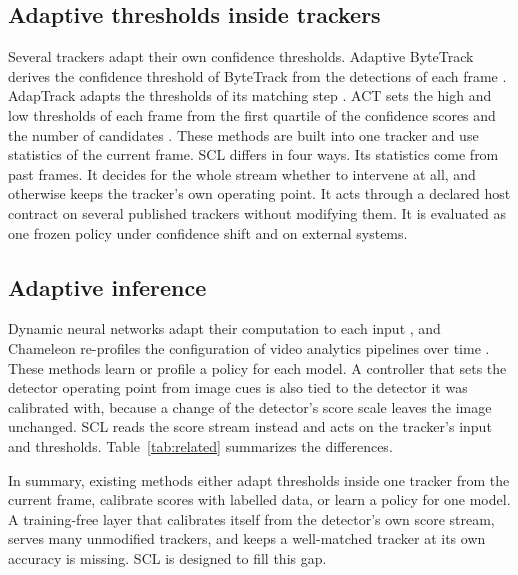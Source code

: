 \documentclass[pdflatex,sn-mathphys-num,iicol]{sn-jnl}
\newcommand{\scl}{SCL}
\begin{document}
\subsection{Adaptive thresholds inside trackers}
Several trackers adapt their own confidence thresholds. Adaptive ByteTrack
derives the confidence threshold of ByteTrack from the detections of each
frame \cite{ma2023adaptivebytetrack}. AdapTrack adapts the thresholds of its
matching step \cite{shim2024adaptrack}. ACT sets the high and low thresholds
of each frame from the first quartile of the confidence scores and the number
of candidates \cite{act2026adaptive}. These methods are built into one tracker
and use statistics of the current frame. \scl{} differs in
four ways. Its statistics come from past frames. It decides for the whole
stream whether to intervene at all, and otherwise keeps the tracker's own
operating point. It acts through a declared host contract on several
published trackers without modifying them. It is evaluated as one frozen
policy under confidence shift and on external systems.

\subsection{Adaptive inference}
Dynamic neural networks adapt their computation to each input
\cite{han2022dynamic}, and Chameleon re-profiles the configuration of video
analytics pipelines over time \cite{jiang2018chameleon}. These methods learn or
profile a policy for each model. A controller that sets the detector operating
point from image cues is also tied to the detector it was calibrated with,
because a change of the detector's score scale leaves the image unchanged.
\scl{} reads the score stream instead and acts on the
tracker's input and thresholds. Table~\ref{tab:related} summarizes the
differences.

In summary, existing methods either adapt thresholds inside one tracker from
the current frame, calibrate scores with labelled data, or learn a policy for
one model. A training-free layer that calibrates itself from the detector's
own score stream, serves many unmodified trackers, and keeps a well-matched
tracker at its own accuracy is missing. \scl{} is designed to fill this gap.
\end{document}
